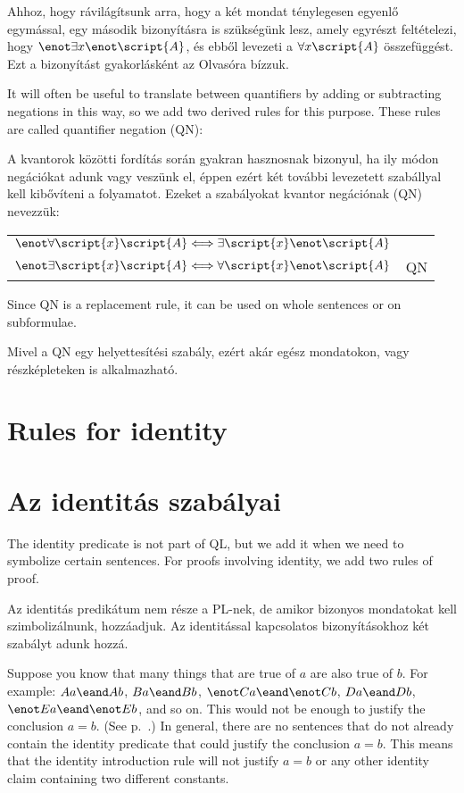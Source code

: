 Ahhoz, hogy rávilágítsunk arra, hogy a két mondat ténylegesen egyenlő egymással, egy második bizonyításra is szükségünk lesz, amely egyrészt feltételezi, hogy $\enot\exists x\enot\script{A}$, és ebből levezeti a $\forall x\script{A}$ összefüggést. Ezt a bizonyítást gyakorlásként az Olvasóra bízzuk.

It will often be useful to translate between quantifiers by adding or subtracting negations in this way, so we add two derived rules for this purpose. These rules are called quantifier negation (QN):

A kvantorok közötti fordítás során gyakran hasznosnak bizonyul, ha ily módon negációkat adunk vagy veszünk el, éppen ezért két további levezetett szabállyal kell kibővíteni a folyamatot. Ezeket a szabályokat kvantor negációnak (QN) nevezzük: 

\begin{center}
\begin{tabular}{rl}
$\enot\forall\script{x}\script{A} \Longleftrightarrow \exists\script{x}\enot\script{A}$\\
$\enot\exists\script{x}\script{A} \Longleftrightarrow \forall\script{x}\enot\script{A}$
& QN
\end{tabular}
\end{center}
Since QN is a replacement rule, it can be used on whole sentences or on subformulae.

Mivel a QN egy helyettesítési szabály, ezért akár egész mondatokon, vagy részképleteken is alkalmazható.



\section*{Rules for identity}
\section{Az identitás szabályai}
The identity predicate is not part of QL, but we add it when we need to symbolize certain sentences. For proofs involving identity, we add two rules of proof.

Az identitás predikátum nem része a PL-nek, de amikor bizonyos mondatokat kell szimbolizálnunk, hozzáadjuk. Az identitással kapcsolatos bizonyításokhoz két szabályt adunk hozzá.

Suppose you know that many things that are true of $a$ are also true of $b$. For example: $Aa\eand Ab$, $Ba\eand Bb$, $\enot Ca\eand\enot Cb$, $Da\eand Db$, $\enot Ea\eand\enot Eb$, and so on. This would not be enough to justify the conclusion $a=b$. (See p.~\pageref{model.nonidentity}.) In general, there are no sentences that do not already contain the identity predicate that could justify the conclusion $a=b$. This means that the identity introduction rule will not justify $a=b$ or any other identity claim containing two different constants.

